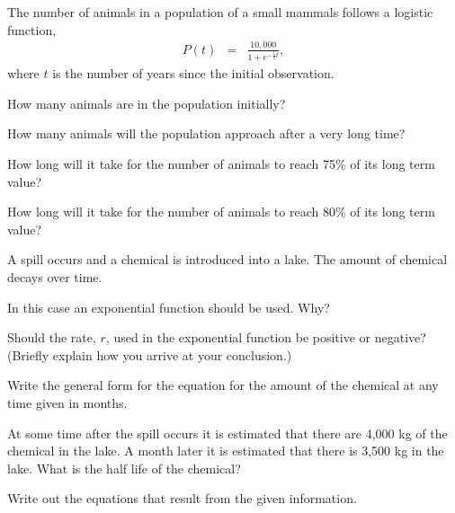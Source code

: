 \begin{problem}
\item The number of animals in a population of a small mammals follows
  a logistic function,
  \begin{eqnarray*}
    P(t) & = & \frac{10,000}{1+e^{-\frac{1}{2}t}},
  \end{eqnarray*}
  where $t$ is the number of years since the initial observation.
  \begin{subproblem}
  \item How many animals are in the population initially?
    \vspace{4em}
  \item How many animals will the population approach after a very
    long time?
    \vspace{4em}
  \item How long will it take for the number of animals to reach 75\%
    of its long term value?
    \vfill
  \item How long will it take for the number of animals to reach 80\%
    of its long term value?
    \vfill
  \end{subproblem}

\clearpage

\item A spill occurs and a chemical is introduced into a lake. The
  amount of chemical decays over time. 
  \begin{subproblem}
  \item In this case an exponential function should be used. Why?
    \vspace{2em}

  \item Should the rate, $r$, used in the exponential function be
    positive or negative? (Briefly explain how you arrive at your
    conclusion.)  
    \vspace{2em}

  \item Write the general form for the equation for the amount of the
    chemical at any time given in months.
    \vspace{2em}

  \item At some time after the spill occurs it is estimated that there
    are 4,000 kg of the chemical in the lake. A month later it is
    estimated that there is 3,500 kg in the lake. What is the half
    life of the chemical?
    \begin{subsubproblem}
    \item Write out the equations that result from the given information.
      \vspace{2em}


\end{subsubproblem}
\end{subproblem}
\end{problem}
